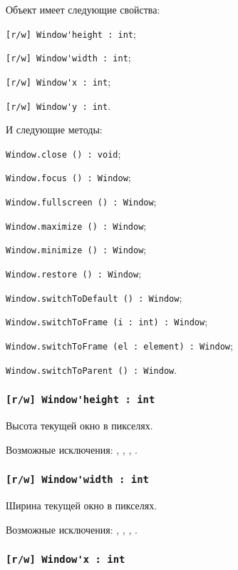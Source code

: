 Объект \window{} имеет следующие свойства:
\begin{icItems}
	\item \lstinline|[r/w] Window'height : int|;
	\item \lstinline|[r/w] Window'width : int|;
	\item \lstinline|[r/w] Window'x : int|;
	\item \lstinline|[r/w] Window'y : int|.
\end{icItems}

И следующие методы:
\begin{icItems}
	\item \lstinline|Window.close () : void|;
	\item \lstinline|Window.focus () : Window|;
	\item \lstinline|Window.fullscreen () : Window|;
	\item \lstinline|Window.maximize () : Window|;
	\item \lstinline|Window.minimize () : Window|;
	\item \lstinline|Window.restore () : Window|;
	\item \lstinline|Window.switchToDefault () : Window|;
	\item \lstinline|Window.switchToFrame (i : int) : Window|;
	\item \lstinline|Window.switchToFrame (el : element) : Window|;
	\item \lstinline|Window.switchToParent () : Window|.
\end{icItems}

\subsubsection{\lstinline|[r/w] Window'height : int|}

Высота текущей окно в пикселях.

Возможные исключения: , , , .

\subsubsection{\lstinline|[r/w] Window'width : int|}

Ширина текущей окно в пикселях.

Возможные исключения: , , , .

\subsubsection{\lstinline|[r/w] Window'x : int|}

